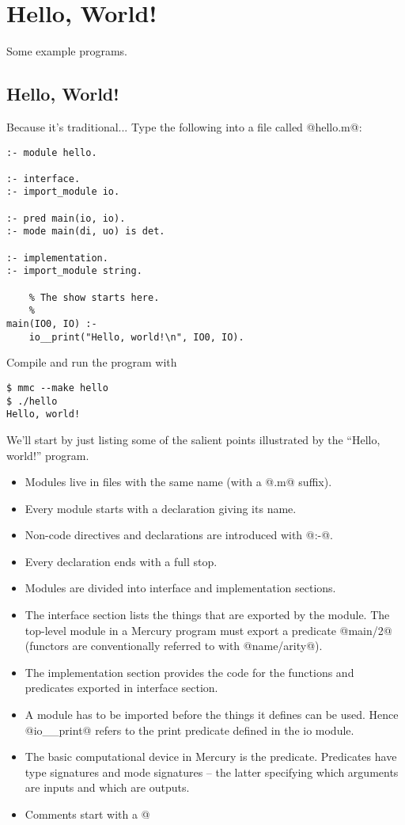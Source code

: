 \chapter{Hello, World!}

Some example programs.

\section{Hello, World!}

Because it's traditional...  Type the following into a file called
@hello.m@:
\begin{verbatim}
:- module hello.

:- interface.
:- import_module io.

:- pred main(io, io).
:- mode main(di, uo) is det.

:- implementation.
:- import_module string.

    % The show starts here.
    %
main(IO0, IO) :-
    io__print("Hello, world!\n", IO0, IO).
\end{verbatim}
Compile and run the program with
\begin{verbatim}
$ mmc --make hello
$ ./hello
Hello, world!
\end{verbatim}
We'll start by just listing some of the salient points illustrated
by the ``Hello, world!'' program.
\begin{itemize}
\item Modules live in files with the same name (with a @.m@ suffix).
\item Every module starts with a declaration giving its name.
\item Non-code directives and declarations are introduced with @:-@.
\item Every declaration ends with a full stop.
\item Modules are divided into interface and implementation sections.
\item The interface section lists the things that are exported by the
  module.  The top-level module in a Mercury program must export a
  predicate @main/2@ (functors are conventionally referred to with
  @name/arity@).
\item The implementation section provides the code for the functions
  and predicates exported in interface section.
\item A module has to be imported before the things it defines can be
  used.  Hence @io__print@ refers to the print predicate defined in
  the io module.
\item The basic computational device in Mercury is the predicate.
  Predicates have type signatures and mode signatures -- the latter
  specifying which arguments are inputs and which are outputs.
\item Comments start with a @%
\end{itemize}

